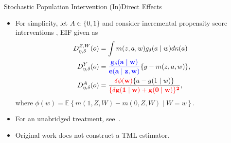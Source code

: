 \documentclass{beamer}
\begin{document}

\begin{frame}[c]{Stochastic Population Intervention (In)Direct Effects}

\begin{center}
\begin{itemize}
\itemsep2pt
\item For simplicity, let $A \in \{0, 1\}$ and consider incremental propensity
  score interventions \citep{kennedy2017nonparametric}, EIF given as
  \vspace{-0.5em}
  \begin{align*}
    D^{Z, W}_{\eta, \delta}(o) &= \int m(z, a, w) g_{\delta}(a \mid w)
      d\kappa(a)\\
    D^Y_{\eta, \delta}(o) &= \mathbf{\textcolor{blue}{\frac{g_{\delta}(a \mid w)}
      {e(a \mid z, w)}}} \{y - m(z,a,w) \},\\
    D^A_{\eta,\delta}(o) &= \frac{\mathbf{\textcolor{red}{\delta\phi(w)}}\{a -
      g(1 \mid w)\}}{\mathbf{\textcolor{red}{\{\delta g(1 \mid w) +
      g(0 \mid w)\}^2}}},
  \end{align*}
  where $\phi(w) = \mathbb{E}\left\{m(1, Z, W) - m(0, Z, W) \mid W = w
  \right\}$.
\item For an unabridged treatment, see~\cite{diaz2019causal}.
\item Original work does not construct a TML estimator.
\end{itemize}
\end{center}

\note{
}

\end{frame}

\end{document}
